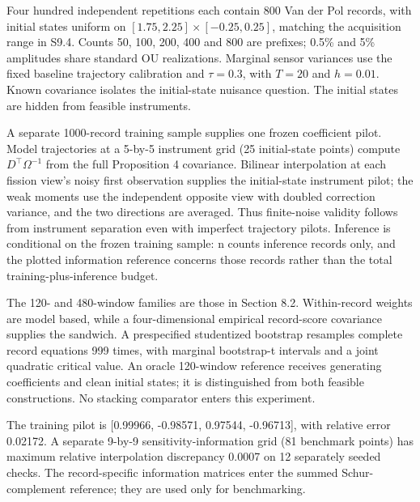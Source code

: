 \documentclass[
  american,
  11pt,
]{article}
\begin{document}
Four hundred independent repetitions each contain 800 Van der Pol
records, with initial states uniform on
\([1.75,2.25]\times[-0.25,0.25]\), matching the acquisition range in
S9.4. Counts 50, 100, 200, 400 and 800 are prefixes; 0.5\% and 5\%
amplitudes share standard OU realizations. Marginal sensor variances use
the fixed baseline trajectory calibration and \(\tau=0.3\), with
\(T=20\) and \(h=0.01\). Known covariance isolates the initial-state
nuisance question. The initial states are hidden from feasible
instruments.

A separate 1000-record training sample supplies one frozen coefficient
pilot. Model trajectories at a 5-by-5 instrument grid (25 initial-state
points) compute \(D^\top\Omega^{-1}\) from the full Proposition 4
covariance. Bilinear interpolation at each fission view's noisy first
observation supplies the initial-state instrument pilot; the weak
moments use the independent opposite view with doubled correction
variance, and the two directions are averaged. Thus finite-noise
validity follows from instrument separation even with imperfect
trajectory pilots. Inference is conditional on the frozen training
sample: n counts inference records only, and the plotted information
reference concerns those records rather than the total
training-plus-inference budget.

The 120- and 480-window families are those in Section 8.2. Within-record
weights are model based, while a four-dimensional empirical record-score
covariance supplies the sandwich. A prespecified studentized bootstrap
resamples complete record equations 999 times, with marginal bootstrap-t
intervals and a joint quadratic critical value. An oracle 120-window
reference receives generating coefficients and clean initial states; it
is distinguished from both feasible constructions. No stacking
comparator enters this experiment.

The training pilot is {[}0.99966, -0.98571, 0.97544, -0.96713{]}, with
relative error 0.02172. A separate 9-by-9 sensitivity-information grid
(81 benchmark points) has maximum relative interpolation discrepancy
0.0007 on 12 separately seeded checks. The record-specific information
matrices enter the summed Schur-complement reference; they are used only
for benchmarking.
\end{document}
